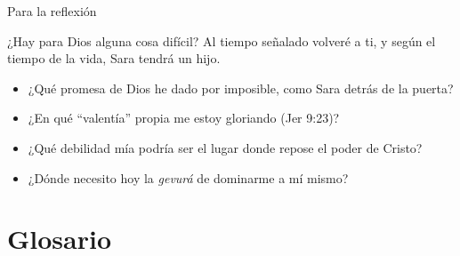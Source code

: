 \begin{frame}{Para la reflexión}
\begin{cita}¿Hay para Dios alguna cosa difícil? Al tiempo señalado volveré a ti, y según el tiempo de la vida, Sara tendrá un hijo.\end{cita}
\begin{center}\end{center}
\small
\begin{itemize}
\item ¿Qué promesa de Dios he dado por imposible, como Sara detrás de la puerta?
\item ¿En qué ``valentía'' propia me estoy gloriando (Jer 9:23)?
\item ¿Qué debilidad mía podría ser el lugar donde repose el poder de Cristo?
\item ¿Dónde necesito hoy la \emph{gevurá} de dominarme a mí mismo?
\end{itemize}
\end{frame}

\section{Glosario}

